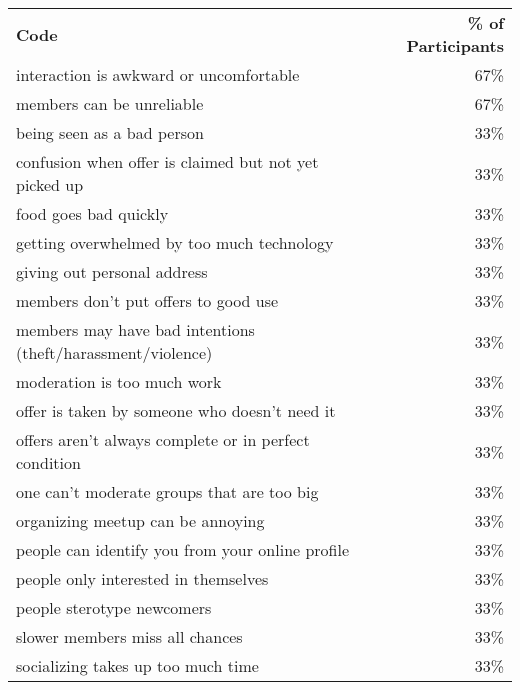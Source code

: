 \begin{longtable}{p{}r}
\textbf{Code}                                               & \textbf{\% of Participants} \\
interaction is awkward or uncomfortable                     & 67\%                        \\
members can be unreliable                                   & 67\%                        \\
being seen as a bad person                                  & 33\%                        \\
confusion when offer is claimed but not yet picked up       & 33\%                        \\
food goes bad quickly                                       & 33\%                        \\
getting overwhelmed by too much technology                  & 33\%                        \\
giving out personal address                                 & 33\%                        \\
members don't put offers to good use                        & 33\%                        \\
members may have bad intentions (theft/harassment/violence) & 33\%                        \\
moderation is too much work                                 & 33\%                        \\
offer is taken by someone who doesn't need it               & 33\%                        \\
offers aren't always complete or in perfect condition       & 33\%                        \\
one can't moderate groups that are too big                  & 33\%                        \\
organizing meetup can be annoying                           & 33\%                        \\
people can identify you from your online profile            & 33\%                        \\
people only interested in themselves                        & 33\%                        \\
people sterotype newcomers                                  & 33\%                        \\
slower members miss all chances                             & 33\%                        \\
socializing takes up too much time                          & 33\%
\end{longtable}

